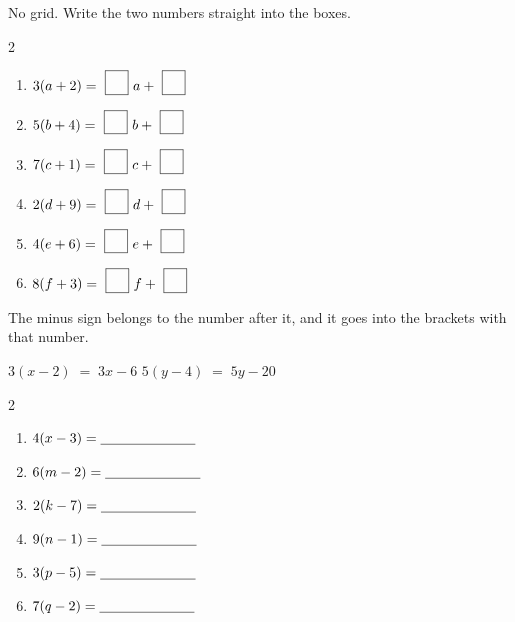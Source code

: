\documentclass[12pt,a4paper]{article}
\newcommand{\nbox}{\ \fbox{\rule{0pt}{1.05em}\rule{1.0em}{0pt}}\ }
\begin{document}

\noindent No grid. Write the two numbers straight into the boxes.

\vspace{4pt}
\begin{multicols}{2}
\begin{enumerate}[label=(\alph*), itemsep=13pt]
  \item $3(a + 2) = \nbox a + \nbox$
  \item $5(b + 4) = \nbox b + \nbox$
  \item $7(c + 1) = \nbox c + \nbox$
  \item $2(d + 9) = \nbox d + \nbox$
  \item $4(e + 6) = \nbox e + \nbox$
  \item $8(f + 3) = \nbox f + \nbox$
\end{enumerate}
\end{multicols}


\noindent The minus sign belongs to the number after it, and it goes into the brackets
with that number.

\begin{remember}
  \hspace*{1.2em}$3(x - 2) \;=\; 3x - 6$ \qquad
  \hspace*{1.2em}$5(y - 4) \;=\; 5y - 20$
\end{remember}

\vspace{2pt}
\begin{multicols}{2}
\begin{enumerate}[label=(\alph*), itemsep=11pt]
  \item $4(x - 3) = \blank[2.4cm]$
  \item $6(m - 2) = \blank[2.4cm]$
  \item $2(k - 7) = \blank[2.4cm]$
  \item $9(n - 1) = \blank[2.4cm]$
  \item $3(p - 5) = \blank[2.4cm]$
  \item $7(q - 2) = \blank[2.4cm]$
\end{enumerate}
\end{multicols}

\end{document}
